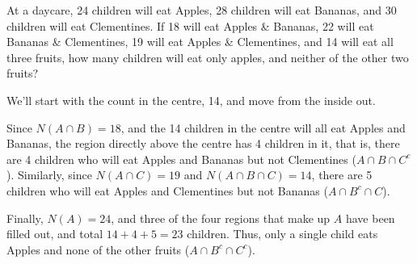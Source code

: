\begin{example}
At a daycare, 24 children will eat Apples, 28 children will eat Bananas, and 30 children will eat Clementines. If 18 will eat Apples \& Bananas, 22 will eat Bananas \& Clementines, 19 will eat Apples \& Clementines, and 14 will eat all three fruits, how many children will eat only apples, and neither of the other two fruits?

We'll start with the count in the centre, 14, and move from the inside out. 

\begin{center}
\end{center}

Since $N(A \cap B) = 18$, and the 14 children in the centre will all eat Apples and Bananas, the region directly above the centre has 4 children in it, that is, there are 4 children who will eat Apples and Bananas but not Clementines ($A \cap B \cap C^c$). Similarly, since $N(A \cap C) = 19$ and $N(A \cap B \cap C) = 14$, there are 5 children who will eat Apples and Clementines but not Bananas ($A \cap B^c \cap C$).

\begin{center}
\end{center}

Finally, $N(A) = 24$, and three of the four regions that make up $A$ have been filled out, and total $14+4+5 = 23$ children. Thus, only a single child eats Apples and none of the other fruits ($A \cap B^c \cap C^c$). 

\begin{center}
\end{center}

\end{example}

